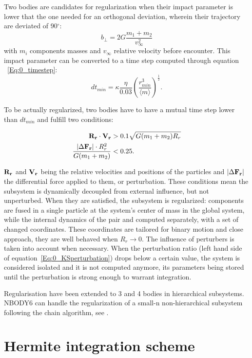 Two bodies are candidates for regularization when their impact parameter is lower that the one needed for an orthogonal deviation, wherein their trajectory are deviated of 90$^\circ$:
\begin{equation}
b_\perp = 2G \frac{m_1 +m_2}{v^2_\infty}
\end{equation}
with $m_i$ components masses and $v_\infty$ relative velocity before encounter. This impact parameter can be converted to a time step computed through equation ~\ref{Eq:0_timestep}:
\begin{equation}
dt_{min} = \kappa \frac{\eta}{0.03} \left( \frac{r^3_{min}}{\langle m \rangle}\right)^\frac{1}{2}.
\end{equation}

To be actually regularized, two bodies have to have a mutual time step lower than $dt_{min}$ and fulfill two conditions:

\begin{align}
\bold{R_r} \cdot \bold{V_r} &> 0.1 \sqrt{ G(m_1+m_2)R_r}\\
\label{Eq:0_KSperturbation}
\frac{\left| \Delta \bold{F_r} \right| \cdot R^2_r}{G(m_1+m_2)} &< 0.25.
\end{align}

$\bold{R_r}$ and $\bold{V_r}$ being the relative velocities and positions of the particles and $\left| \Delta \bold{F_r} \right|$ the differential force applied to them, or perturbation. These conditions mean the subsystem is dynamically decoupled from external influence, but not unperturbed. When they are satisfied, the subsystem is regularized: components are fused in a single particle at the system's center of mass in the global system, while the internal dynamics of the pair and computed separately, with a set of changed coordinates. These coordinates are tailored for binary motion and close approach, they are well behaved when $R_r \rightarrow 0$. The influence of perturbers is taken into account when necessary. When the perturbation ratio (left hand side of equation~\ref{Eq:0_KSperturbation}) drops below a certain value, the system is considered isolated and it is not computed anymore, its parameters being stored until the perturbation is strong enough to warrant integration.

Regularisation have been extended to 3 and 4 bodies in hierarchical subsystems. NBODY6 can handle the regularization of a small-n non-hierarchical subsystem following the chain algorithm, see \cite{Mikkola1993}.


\section{Hermite integration scheme}

